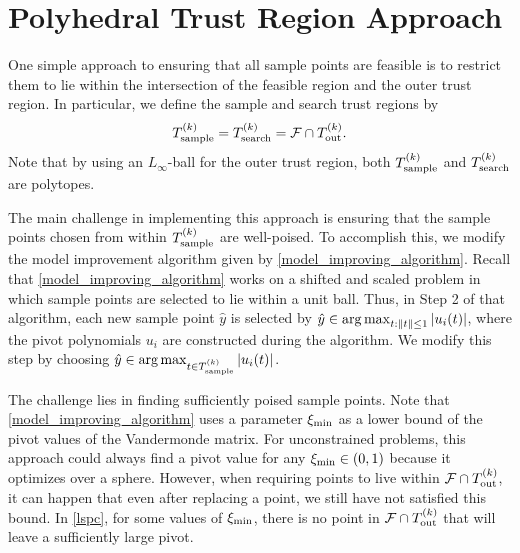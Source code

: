\documentclass{article}
\begin{document}
\section{Polyhedral Trust Region Approach}
\label{sec:polyhedral}

One simple approach to ensuring that all sample points are feasible is to restrict them to lie within the intersection of the feasible region and the outer trust region.
In particular,  we define the sample and search trust regions by
\[ {T_{\text{sample}}^{(k)}} = {T_{\text{search}}^{(k)}} = {\mathcal F} \cap {T_{\text{out}}^{(k)}}.\]
Note that by using an $L_{\infty}$-ball for the outer trust region, both ${T_{\text{sample}}^{(k)}}$ and ${T_{\text{search}}^{(k)}}$ are polytopes.
 
The main challenge in implementing this approach is ensuring that the sample points chosen from within ${T_{\text{sample}}^{(k)}}$ are well-poised.
To accomplish this, we modify the model improvement algorithm given by \cref{model_improving_algorithm}.   
Recall that \cref{model_improving_algorithm} works on a shifted and scaled problem in which sample points are selected to lie within a unit ball.
Thus,  in Step 2 of that algorithm,  each new sample point $\hat{y}$  is selected by  
$\hat{y} \in \operatorname*{arg\,max}_{t:{\left\|t\right\|} \le 1} \left|u_i(t)\right|$, where the pivot polynomials $u_i$ are constructed during the algorithm.  
We modify this step by choosing $\hat{y} \in \operatorname*{arg\,max}_{t\in {T_{\text{sample}}^{(k)}}} \left|u_i(t)\right|$.  




The challenge lies in finding sufficiently poised sample points.
Note that \cref{model_improving_algorithm} uses a parameter $  \xi_{\text{min}} $ as a lower bound of the pivot values of the Vandermonde matrix.
For unconstrained problems, this approach could always find a pivot value for any $ \xi_{\text{min}} \in (0,1)$ because it optimizes over a sphere.
However, when requiring points to live within $ {\mathcal F} \cap {T_{\text{out}}^{(k)}} $, it can happen that even after replacing a point, we still have not satisfied this bound.
In \cref{lspc}, for some values of $  \xi_{\text{min}} $, there is no point in $ {\mathcal F} \cap {T_{\text{out}}^{(k)}} $ that will leave a sufficiently large pivot.
\end{document}

